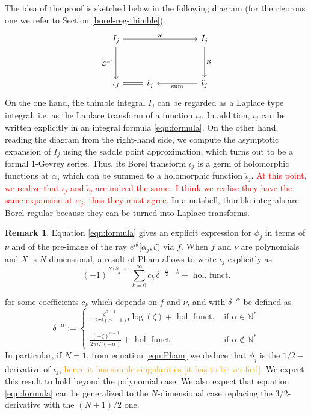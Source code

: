 \documentclass{article}
\theoremstyle{definition}
\newcommand{\series}[1]{\tilde{#1}}
\newcommand{\laplace}{\mathcal{L}}
\newcommand{\borel}{\mathcal{B}}
\newcommand{\aexp}{\text{\ae}}
\newtheorem{remark}[definition]{Remark}
\begin{document}
The idea of the proof is sketched below in the following diagram (for the rigorous one we refer to Section \ref{borel-reg-thimble}).
\[
\begin{tikzcd}
{I}_{j} \arrow[rrr,"\aexp"]\arrow[dd, swap,"\laplace^{-1} "] &  & & \tilde{I}_{j}\arrow[dd,"\borel"]\\
& & &\\
\iota_j \arrow[r,equal] & \hat{\iota}_j & &\tilde{\iota}_{j} \arrow[ll, "\text{sum}"]
\end{tikzcd}
\]
On the one hand, the thimble integral $I_j$ can be regarded as a Laplace type integral, i.e. as the Laplace transform of a function $\iota_j$. In addition, $\iota_j$ can be written explicitly in an integral formula \eqref{eqn:formula}. 
On the other hand, reading the diagram from the right-hand side, we compute the asymptotic expansion of $I_j$ using the saddle point approximation, which turns out to be a formal $1$-Gevrey series. Thus, its Borel transform $\series{\iota}_j$ is a germ of holomorphic functions at $\alpha_j$ which can be summed to a holomorphic function $\hat{\iota}_j$. \textcolor{red}{At this point, we realize that $\iota_j$ and $\hat{\iota}_j$ are indeed the same.--I think we realise they have the same expansion at $\alpha_j$, thus they must agree.} In a nutshell, thimble integrals are Borel regular because they can be turned into Laplace transforms.      

\begin{remark}
    Equation \eqref{eqn:formula} gives an explicit expression for $\phi_j$ in terms of $\nu$ and of the pre-image of the ray $e^{i\theta}[\alpha_j,\zeta)$ via $f$. When $f$ and $\nu$ are polynomials and $X$ is $N$-dimensional, a result of Pham \cite[Equation 2.4, II partie]{pham} allows to write $\iota_j$ explicitly as 
    \begin{equation}\label{eqn:Pham}
        (-1)^{\frac{N(N-1)}{2}}  \sum_{k=0}^\infty c_k\, \delta^{-\frac{N}{2}-k}+ \text{ hol. funct.}
    \end{equation}

    for some coefficients $c_k$ which depends on $f$ and $\nu$, and with $\delta^{-\alpha}$ be defined as
   \begin{equation*}
       \delta^{-\alpha}:=\begin{cases}
           \frac{\zeta^{\alpha-1}}{-2\pi i(\alpha-1)!}\log(\zeta) + \text{ hol. funct.} & \text{ if } \alpha\in\mathbb{N}^*\\
           & \\
           \frac{(-\zeta)^{\alpha-1}}{2\pi i \Gamma(-\alpha)}+ \text{ hol. funct.} & \text{ if } \alpha\notin \mathbb{N}^* 
       \end{cases}
   \end{equation*}
In particular, if $N=1$, from equation \eqref{eqn:Pham} we deduce that $\phi_j$ is the $1/2-$ derivative of $\iota_j$, \textcolor{orange}{hence it has simple singularities [it has to be verified]}. We expect this result to hold beyond the polynomial case. We also expect that equation \eqref{eqn:formula} can be generalized to the $N$-dimensional case replacing the $3/2$-derivative with the $(N+1)/2$ one. 
\end{remark}
\end{document}
